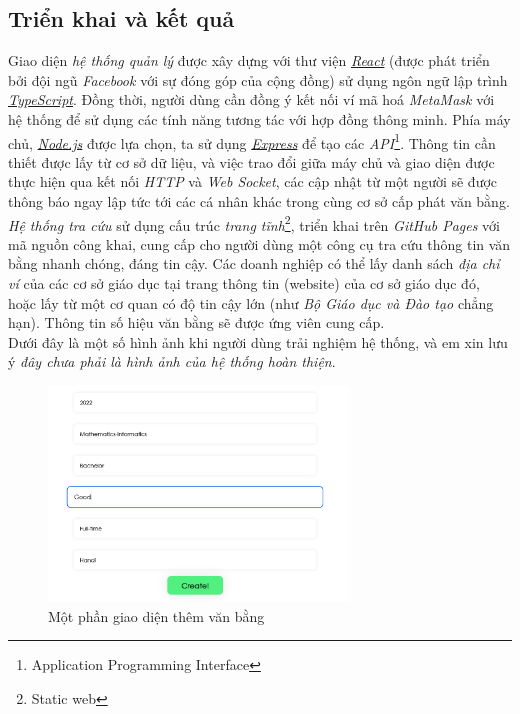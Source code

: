 \subsection{Triển khai và kết quả}

Giao diện \textit{hệ thống quản lý} được xây dựng với thư viện \href{https://reactjs.org}{\textit{React}} (được phát triển bởi đội ngũ \textit{Facebook} với sự đóng góp của cộng đồng) sử dụng ngôn ngữ lập trình \href{https://www.typescriptlang.org/}{\textit{TypeScript}}. Đồng thời, người dùng cần đồng ý kết nối ví mã hoá \textit{MetaMask} với hệ thống để sử dụng các tính năng tương tác với hợp đồng thông minh. Phía máy chủ, \href{https://nodejs.org}{\textit{Node.js}} được lựa chọn, ta sử dụng \href{https://expressjs.com/}{\textit{Express}} để tạo các \textit{API}\footnote{Application Programming Interface}. Thông tin cần thiết được lấy từ cơ sở dữ liệu, và việc trao đổi giữa máy chủ và giao diện được thực hiện qua kết nối \textit{HTTP} và \textit{Web Socket}, các cập nhật từ một người sẽ được thông báo ngay lập tức tới các cá nhân khác trong cùng cơ sở cấp phát văn bằng.\\

\textit{Hệ thống tra cứu} sử dụng cấu trúc \textit{trang tĩnh}\footnote{Static web}, triển khai trên \textit{GitHub Pages} với mã nguồn công khai, cung cấp cho người dùng một công cụ tra cứu thông tin văn bằng nhanh chóng, đáng tin cậy. Các doanh nghiệp có thể lấy danh sách \textit{địa chỉ ví} của các cơ sở giáo dục tại trang thông tin (website) của cơ sở giáo dục đó, hoặc lấy từ một cơ quan có độ tin cậy lớn (như \textit{Bộ Giáo dục và Đào tạo} chẳng hạn). Thông tin số hiệu văn bằng sẽ được ứng viên cung cấp.\\

Dưới đây là một số hình ảnh khi người dùng trải nghiệm hệ thống, và em xin lưu ý \textit{đây chưa phải là hình ảnh của hệ thống hoàn thiện}.\\

\begin{figure}[!ht]
    \centering
    \includegraphics[width=300px]{images/app-create-cert.png}
    \caption{Một phần giao diện thêm văn bằng}
\end{figure}

